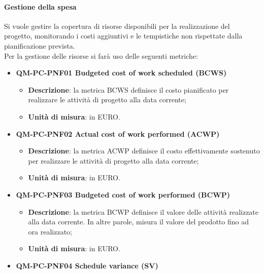             \paragraph{Gestione della spesa }
                Si vuole gestire la copertura di risorse disponibili per la realizzazione del progetto, monitorando i costi aggiuntivi e le tempistiche non rispettate dalla pianificazione prevista.\\
                Per la gestione delle risorse si farà uso delle seguenti metriche:
                \begin{itemize}
                    \item\textbf{QM-PC-PNF01 Budgeted cost of work scheduled (BCWS)}
                        \begin{itemize}
                            \item\textbf{Descrizione}: la metrica BCWS definisce il costo pianificato per realizzare le attività di progetto alla data corrente;
                            \item\textbf{Unità di misura}: in EURO.
                        \end{itemize}
                    \item\textbf{QM-PC-PNF02 Actual cost of work performed (ACWP)}
                        \begin{itemize}
                            \item\textbf{Descrizione}: la metrica ACWP definisce il costo effettivamente sostenuto per realizzare le attività di progetto alla data corrente;
                            \item\textbf{Unità di misura}: in EURO.
                        \end{itemize}
                    \item\textbf{QM-PC-PNF03 Budgeted cost of work performed (BCWP)}
                        \begin{itemize}
                            \item\textbf{Descrizione}: la metrica BCWP definisce il valore delle attività realizzate alla data corrente. In altre parole, misura il valore del prodotto fino ad ora realizzato;
                            \item\textbf{Unità di misura}: in EURO.
                        \end{itemize}
                    \item\textbf{QM-PC-PNF04 Schedule variance (SV)}
                        \begin{itemize}

\end{itemize}
\end{itemize}
